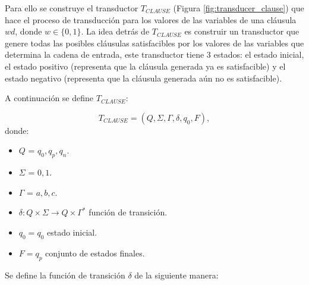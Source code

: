 \documentclass[12pt]{article}
\begin{document}
Para ello se construye el transductor $T_{CLAUSE}$ (Figura \ref{fig:transducer_clause}) que hace el proceso de 
transducción para los valores de las variables de una cláusula $wd$, donde $w\in \{0,1\}$. La idea detrás de $T_{CLAUSE}$
es construir un transductor que genere todas las posibles cláusulas satisfacibles por los valores de las variables
que determina la cadena de entrada, este transductor tiene 3 estados: el estado inicial, el estado positivo (representa que la
cláusula generada ya es satisfacible) y el estado negativo (representa que la cláusula generada aún no es satisfacible).

A continuación se define $T_{CLAUSE}$:

\[
    T_{CLAUSE} = (Q, {\Sigma}, \Gamma, \delta, q_{0}, F),
\]
donde:
\begin{itemize}
    \item \(Q\) = ${q_0,q_p,q_n}$.
    \item \(\Sigma\) = ${0,1}$.
    \item \(\Gamma\) = ${a,b,c}$.
    \item \(\delta: Q \times \Sigma \to Q \times \Gamma^*\) función de transición.
    \item \(q_{0} = q_0\) estado inicial.
    \item \(F={q_p}\) conjunto de estados finales.
\end{itemize}
Se define la función de transición $\delta$ de la siguiente manera:
\end{document}
